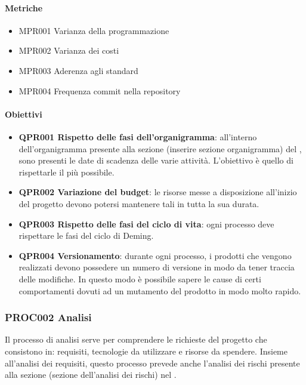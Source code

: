 		\paragraph*{Metriche}
		
		\begin{itemize}
			\item MPR001 Varianza della programmazione
			\item MPR002 Varianza dei costi
			\item MPR003 Aderenza agli standard
			\item MPR004 Frequenza commit nella repository
		\end{itemize}
	
		\paragraph*{Obiettivi}
		
		\begin{itemize} 
			\item \textbf{QPR001 Rispetto delle fasi dell'organigramma}: all'interno dell'organigramma presente alla sezione (inserire sezione organigramma) del \Doc{\PdPv}, sono presenti le date di scadenza delle varie attività. L'obiettivo è quello di rispettarle il più possibile.
			\item \textbf{QPR002 Variazione del budget}: le risorse messe a disposizione all'inizio del progetto devono potersi mantenere tali in tutta la sua durata.
			\item \textbf{QPR003 Rispetto delle fasi del ciclo di vita}: ogni processo deve rispettare le fasi del ciclo di Deming.
			\item \textbf{QPR004 Versionamento}: durante ogni processo, i prodotti che vengono realizzati devono possedere un numero di versione in modo da tener traccia delle modifiche. In questo modo è possibile sapere le cause di certi comportamenti dovuti ad un mutamento del prodotto in modo molto rapido.  
		\end{itemize}
	
	\subsubsection{PROC002 Analisi}
	Il processo di analisi serve per comprendere le richieste del progetto che consistono in: requisiti, tecnologie da utilizzare e risorse da spendere.
	Insieme all'analisi dei requisiti, questo processo prevede anche l'analisi dei rischi presente alla sezione (sezione dell'analisi dei rischi) nel \Doc{\PdPv}.
	
